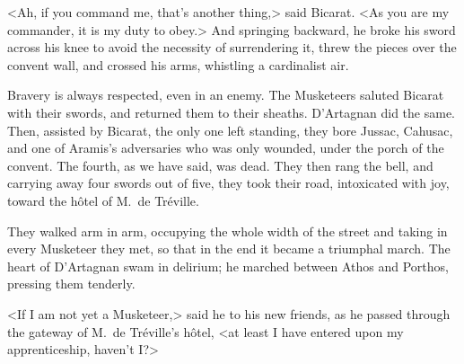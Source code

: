 <Ah, if you command me, that's another thing,> said Bicarat. <As you are my commander, it is my duty to obey.> And springing backward, he broke his sword across his knee to avoid the necessity of surrendering it, threw the pieces over the convent wall, and crossed his arms, whistling a cardinalist air. 

Bravery is always respected, even in an enemy. The Musketeers saluted Bicarat with their swords, and returned them to their sheaths. D'Artagnan did the same. Then, assisted by Bicarat, the only one left standing, they bore Jussac, Cahusac, and one of Aramis's adversaries who was only wounded, under the porch of the convent. The fourth, as we have said, was dead. They then rang the bell, and carrying away four swords out of five, they took their road, intoxicated with joy, toward the hôtel of M.~de Tréville. 

They walked arm in arm, occupying the whole width of the street and taking in every Musketeer they met, so that in the end it became a triumphal march. The heart of D'Artagnan swam in delirium; he marched between Athos and Porthos, pressing them tenderly. 

<If I am not yet a Musketeer,> said he to his new friends, as he passed through the gateway of M.~de Tréville's hôtel, <at least I have entered upon my apprenticeship, haven't I?> 